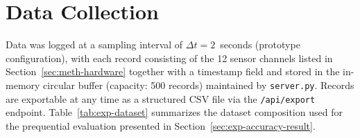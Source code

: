 \begin{table}[htbp]
\centering
\caption{Measured sensor baseline resistance ($R_0$) values from clean-air calibration}
\label{tab:calibration-results}
\end{table}

\section{Data Collection}
\label{sec:exp-data-collection}

Data was logged at a sampling interval of $\Delta t = 2$~seconds (prototype configuration), with each record consisting of the 12 sensor channels listed in Section~\ref{sec:meth-hardware} together with a timestamp field and stored in the in-memory circular buffer (capacity: 500 records) maintained by \texttt{server.py}. Records are exportable at any time as a structured CSV file via the \texttt{/api/export} endpoint. Table~\ref{tab:exp-dataset} summarizes the dataset composition used for the prequential evaluation presented in Section~\ref{sec:exp-accuracy-result}.

